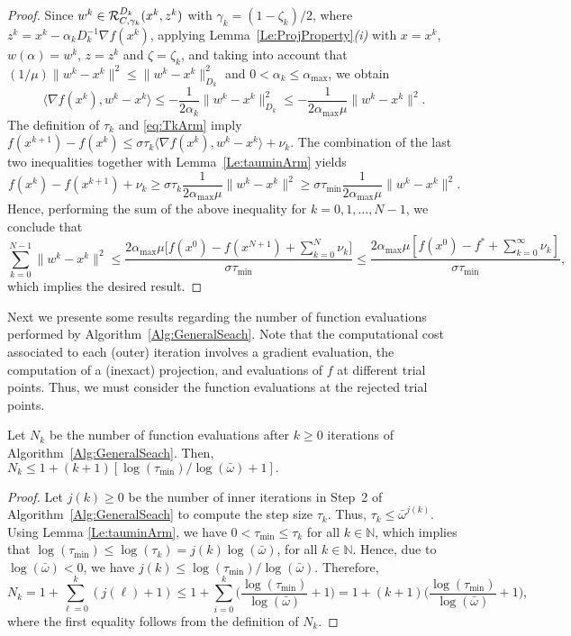 \begin{proof}
	Since  $w^k \in   {\cal R}_{C,\gamma_k}^{D_k}(x^{k}, z^k)$ with    $\gamma_k=(1-\zeta_k)/2$, where $z^k = x^{k}-\alpha_k D^{-1} _k\nabla f(x^{k})$,  applying  Lemma~\ref{Le:ProjProperty}{\it (i)} with $x=x^k$, $w(\alpha) = w^k$, $z = z^k$ and $\zeta= \zeta_k$, and taking into account that $(1/\mu)  \|w^k-x^k\|^2 \leq  \|w^k-x^k\|_{D_k}^2$  and $0<\alpha_k \leq \alpha_{\max}$, we obtain
	\begin{equation*}\label{eq:fD2}
		\big\langle \nabla f(x^{k}), w^k-x^{k}\big\rangle \leq -\frac{1}{2\alpha_k} \|w^k-x^k\|_{D_k}^2\leq -\frac{1}{2\alpha_{\max}\mu} \|w^k-x^k\|^2.
	\end{equation*}
	The definition of $\tau_k$  and \eqref{eq:TkArm} imply  $f(x^{k+1}) - f(x^k) \leq \sigma\tau_k \big\langle \nabla f(x^{k}),  w^k-x^{k} \big\rangle+\nu_k$. The combination of the last two inequalities together with Lemma~\ref{Le:tauminArm} yields
	$$
		f(x^k) - f(x^{k+1})+\nu_k \geq \sigma\tau_k \frac{1}{2\alpha_{\max}\mu} \|w^k-x^k\|^2 \geq \sigma \tau_{\min} \frac{1}{2\alpha_{\max}\mu} \|w^k-x^k\|^2.
	$$
	Hence, performing the sum of the above inequality for $k= 0, 1,\ldots, N-1$, we conclude that
	$$
		\sum_{k= 0}^{N-1} \|w^k - x^k\|^2 \leq \frac{2{\alpha_{\max}}\mu \big[f(x^0) - f(x^{N+1})+ \sum_{k= 0}^{N}\nu_k\big]}{\sigma \tau_{\min}}\leq \frac{2{\alpha_{\max}}\mu \left[ f(x^0) - f^*+ \sum_{k= 0}^{\infty}\nu_k\right]}{\sigma \tau_{\min}},
	$$
	which implies the desired result.
\end{proof}
{Next we presente} some results regarding the  number of function evaluations performed by Algorithm~\ref{Alg:GeneralSeach}.
Note that the computational cost associated to each (outer) iteration involves a gradient evaluation, the computation of a (inexact) projection, and evaluations of $f$ at different trial points.
Thus, we must consider the function evaluations at the rejected trial points.
\begin{lemma} \label{eq:nfeas}
	Let $N_{k}$ be  the number of function evaluations after $k\geq 0$ iterations of Algorithm~\textup{\ref{Alg:GeneralSeach}}. Then,  $N_{k}\leq 1+ (k+1)[\log (\tau_{\min})/\log (\bar\omega)+1].$
\end{lemma}
\begin{proof}
	Let $j(k)\geq 0$ be the number of inner iterations in Step~2 of Algorithm~\ref{Alg:GeneralSeach} to compute the step size $\tau_k$.  Thus, $\tau_k\leq {\bar\omega}^{j(k)}$.
	Using Lemma \ref {Le:tauminArm}, we have  $0< \tau_{\min}\leq  \tau _{k}$ for all  $k\in \mathbb{N}$, which implies that  $ \log \left( \tau_{\min} \right) \leq \log (\tau _{k})=j(k) \log (\bar\omega)$, for all $k \in \mathbb{N}$.  Hence, due to  $\log(\bar\omega) <0$, we have $ j(k) \leq \log (\tau_{\min})/\log (\bar\omega)$. Therefore,
	$$
		N_k =	1+ \sum _{\ell=0}^{k}(j(\ell)+1)\leq 1+  \sum _{i=0}^{k} \Big(\frac{\log (\tau_{\min})}{\log (\bar\omega)} +1\Big)= 1+(k+1) \Big(\frac{\log (\tau_{\min})}{\log (\bar\omega)}+1\Big),
	$$
	where the first equality follows from the definition of $N_k$.
\end{proof}
